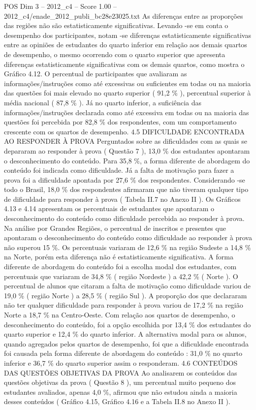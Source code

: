 \begin{textsample}{POS Dim 3 – 2012\_c4 – Score 1.00 – 2012\_c4/enade\_2012\_publi\_bc28e23025.txt}
As diferenças entre as proporções das regiões não são estatisticamente significativas.
Levando -se em conta o desempenho dos participantes, notam -se diferenças estatisticamente significativas entre as opiniões de estudantes do quarto inferior em relação aos demais quartos de desempenho, o mesmo ocorrendo com o quarto superior que apresenta diferenças estatisticamente significativas com os demais quartos, como mostra o Gráfico 4.12.
O percentual de participantes que avaliaram as informações/instruções como até excessivas ou suficientes em todas ou na maioria das questões foi mais elevado no quarto superior ( 91,2 \% ), percentual superior à média nacional ( 87,8 \% ).
Já no quarto inferior, a suficiência das informações/instruções declarada como até excessiva em todas ou na maioria das questões foi percebida por 82,8 \% dos respondentes, com um comportamento crescente com os quartos de desempenho. 4.5 DIFICULDADE ENCONTRADA AO RESPONDER À PROVA Perguntados sobre as dificuldades com as quais se depararam ao responder à prova ( Questão 7 ), 13,0 \% dos estudantes apontaram o desconhecimento do conteúdo.
Para 35,8 \%, a forma diferente de abordagem do conteúdo foi indicada como dificuldade.
Já a falta de motivação para fazer a prova foi a dificuldade apontada por 27,6 \% dos respondentes.
Considerando -se todo o Brasil, 18,0 \% dos respondentes afirmaram que não tiveram qualquer tipo de dificuldade para responder à prova ( Tabela II.7 no Anexo II ).
Os Gráficos 4.13 e 4.14 apresentam os percentuais de estudantes que apontaram o desconhecimento do conteúdo como dificuldade percebida ao responder à prova.
Na análise por Grandes Regiões, o percentual de inscritos e presentes que apontaram o desconhecimento do conteúdo como dificuldade ao responder à prova não superou 15 \%.
Os percentuais variaram de 12,6 \% na região Sudeste a 14,8 \% na Norte, porém esta diferença não é estatisticamente significativa.
A forma diferente de abordagem do conteúdo foi a escolha modal dos estudantes, com percentuais que variaram de 34,8 \% ( região Nordeste ) a 42,2 \% ( Norte ).
O percentual de alunos que citaram a falta de motivação como dificuldade variou de 19,0 \% ( região Norte ) a 28,5 \% ( região Sul ).
A proporção dos que declararam não ter qualquer dificuldade para responder à prova variou de 17,2 \% na região Norte a 18,7 \% na Centro-Oeste.
Com relação aos quartos de desempenho, o desconhecimento do conteúdo, foi a opção escolhida por 13,4 \% dos estudantes do quarto superior e 12,4 \% do quarto inferior.
A alternativa modal para os alunos, quando agregados pelos quartos de desempenho, foi que a dificuldade encontrada foi causada pela forma diferente de abordagem do conteúdo : 31,0 \% no quarto inferior e 36,7 \% do quarto superior assim o responderam. 4.6 CONTEÚDOS DAS QUESTÕES OBJETIVAS DA PROVA Ao analisarem os conteúdos das questões objetivas da prova ( Questão 8 ), um percentual muito pequeno dos estudantes avaliados, apenas 4,0 \%, afirmou que não estudou ainda a maioria desses conteúdos ( Gráfico 4.15, Gráfico 4.16 e a Tabela II.8 no Anexo II ).

\end{textsample}
